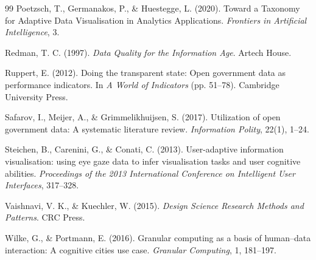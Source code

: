 \documentclass[12pt,a4paper]{article}
\begin{document}
\begin{thebibliography}{99}
 Poetzsch, T., Germanakos, P., \& Huestegge, L. (2020).
 \newblock Toward a Taxonomy for Adaptive Data Visualisation in Analytics Applications.
 \newblock \textit{Frontiers in Artificial Intelligence}, 3.
 \newblock {}

Redman, T. C. (1997).
\newblock \textit{Data Quality for the Information Age}.
\newblock Artech House.

Ruppert, E. (2012).
\newblock Doing the transparent state: Open government data as performance indicators.
\newblock In \textit{A World of Indicators} (pp. 51--78). Cambridge University Press.

Safarov, I., Meijer, A., \& Grimmelikhuijsen, S. (2017).
\newblock Utilization of open government data: A systematic literature review.
\newblock \textit{Information Polity}, 22(1), 1--24.
\newblock {}

 Steichen, B., Carenini, G., \& Conati, C. (2013).
 \newblock User-adaptive information visualisation: using eye gaze data to infer visualisation tasks and user cognitive abilities.
 \newblock \textit{Proceedings of the 2013 International Conference on Intelligent User Interfaces}, 317--328.
 \newblock {}

Vaishnavi, V. K., \& Kuechler, W. (2015).
\newblock \textit{Design Science Research Methods and Patterns}.
\newblock CRC Press.


Wilke, G., \& Portmann, E. (2016).
\newblock Granular computing as a basis of human--data interaction: A cognitive cities use case.
\newblock \textit{Granular Computing}, 1, 181--197.
\newblock {}





\end{thebibliography}
\end{document}
